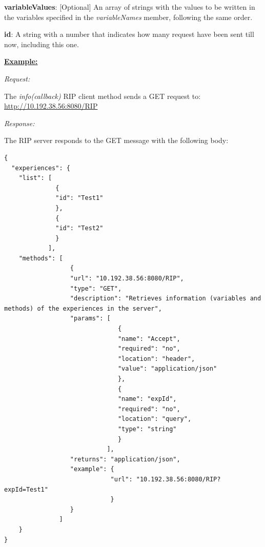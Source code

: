 \begin{myEnumerate}
\begin{myEnumerate}
\begin{myEnumerate}
\begin{myEnumerate}
\begin{myEnumerate}
\begin{myEnumerate}
                            \item \textbf{variableValues}: [Optional] An array of strings with the values to be written in the variables specified in the \textit{variableNames} member, following the same order.
                        \end{myEnumerate}
                        \item \textbf{id}: A string with a number that indicates how many request have been sent till now, including this one.
                    \end{myEnumerate}
            \end{myEnumerate}
        \end{myEnumerate}
    \end{myEnumerate}
\end{myEnumerate}

\textbf{\underline{Example:}}

\textit{Request:}

The \textit{info(callback)} RIP client method sends a GET request to: \url{http://10.192.38.56:8080/RIP}

\textit{Response:}

The RIP server responds to the GET message with the following body:

\begin{lstlisting}
{
  "experiences": {
    "list": [
              {
              "id": "Test1"
              },
              {
              "id": "Test2"
              }
            ],
    "methods": [
                  {
                  "url": "10.192.38.56:8080/RIP",
                  "type": "GET",
                  "description": "Retrieves information (variables and methods) of the experiences in the server",
                  "params": [
                               {
                               "name": "Accept",
                               "required": "no",
                               "location": "header",
                               "value": "application/json"
                               },
                               {
                               "name": "expId",
                               "required": "no",
                               "location": "query",
                               "type": "string" 
                               }
                            ],
                  "returns": "application/json",
                  "example": {
                             "url": "10.192.38.56:8080/RIP?expId=Test1"
                             }
                  }
               ]
    }
}
\end{lstlisting}

